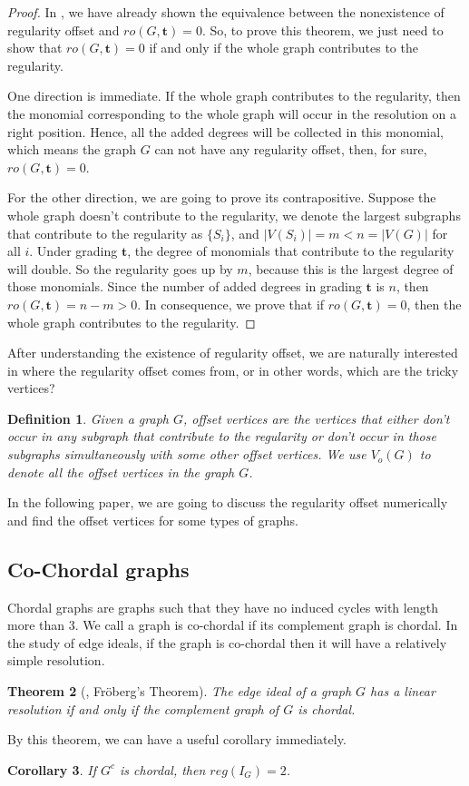 \documentclass[dvipsnames,10pt]{article}
\newtheorem{theorem}{Theorem}[section]
\newtheorem{cor}[theorem]{Corollary}
\newtheorem{defi}[theorem]{Definition}
\begin{document}
\begin{proof}
    In , we have already shown the equivalence between the nonexistence of regularity offset and $ro(G,\mathbf{t})=0$. So, to prove this theorem, we just need to show that $ro(G,\mathbf{t})=0$ if and only if the whole graph contributes to the regularity.

    One direction is immediate. If the whole graph contributes to the regularity, then the monomial corresponding to the whole graph will occur in the resolution on a right position. Hence, all the added degrees will be collected in this monomial, which means the graph $G$ can not have any regularity offset, then, for sure, $ro(G,\mathbf{t})=0$.

    For the other direction, we are going to prove its contrapositive. Suppose the whole graph doesn't contribute to the regularity, we denote the largest subgraphs that contribute to the regularity as $\{S_i\}$, and $|V(S_i)|=m<n=|V(G)|$ for all $i$. Under grading $\mathbf{t}$, the degree of monomials that contribute to the regularity will double. So the regularity goes up by $m$, because this is the largest degree of those monomials. Since the number of added degrees in grading $\mathbf{t}$ is $n$, then $ro(G,\mathbf{t})=n-m>0$. In consequence, we prove that if $ro(G,\mathbf{t})=0$, then the whole graph contributes to the regularity.

    
\end{proof}

After understanding the existence of regularity offset, we are naturally interested in where the regularity offset comes from, or in other words, which are the tricky vertices? 

\begin{defi}
    Given a graph $G$, offset vertices are the vertices that either don't occur in any subgraph that contribute to the regularity or don't occur in those subgraphs simultaneously with some other offset vertices. We use $V_o(G)$ to denote all the offset vertices in the graph $G$.
\end{defi}

In the following paper, we are going to discuss the regularity offset numerically and find the offset vertices for some types of graphs.

\subsection{Co-Chordal graphs}
Chordal graphs are graphs such that they have no induced cycles with length more than $3$. We call a graph is co-chordal if its complement graph is chordal. In the study of edge ideals, if the graph is co-chordal then it will have a relatively simple resolution.
\begin{theorem}[\cite{RalfFröberg1990}, Fröberg’s Theorem]
    The edge ideal of a graph $G$ has a linear resolution if and only if the complement graph of $G$ is chordal.
\end{theorem}
By this theorem, we can have a useful corollary immediately.
\begin{cor}
    If $G^c$ is chordal, then $reg(I_G)=2$.
\end{cor}
\end{document}
